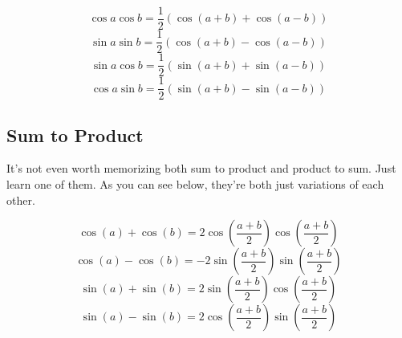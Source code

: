 \documentclass[11pt]{scrartcl}
\begin{document}
\begin{theorem}
$$\cos{a}\cos{b} = \frac{1}{2}(\cos{(a+b)}+\cos{(a-b)})$$
$$\sin{a}\sin{b} = \frac{1}{2}(\cos{(a+b)}-\cos{(a-b)})$$
$$\sin{a}\cos{b} = \frac{1}{2}(\sin{(a+b)}+\sin{(a-b)})$$
$$\cos{a}\sin{b} = \frac{1}{2}(\sin{(a+b)}-\sin{(a-b)})$$
\end{theorem}

\subsection{Sum to Product}

\vspace{5mm}
\noindent It's not even worth memorizing both sum to product and product to sum. Just learn one of them. As you can see below, they're both just variations of each other.

\begin{theorem}
$$\cos{(a)}+\cos{(b)} = 2\cos{(\frac{a+b}{2})}\cos{(\frac{a+b}{2})}$$
$$\cos{(a)}-\cos{(b)} = -2\sin{(\frac{a+b}{2})}\sin{(\frac{a+b}{2})}$$
$$\sin{(a)}+\sin{(b)} = 2\sin{(\frac{a+b}{2})}\cos{(\frac{a+b}{2})}$$
$$\sin{(a)}-\sin{(b)} = 2\cos{(\frac{a+b}{2})}\sin{(\frac{a+b}{2})}$$
\end{theorem}
\end{document}
